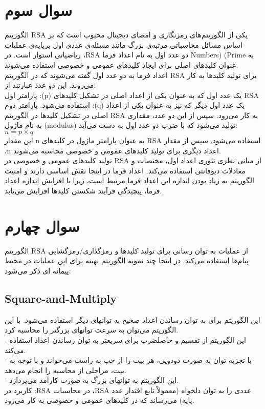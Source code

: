 \section{سوال سوم}
الگوریتم RSA یکی از الگوریتم‌های رمزنگاری و امضای دیجیتال محبوب است که بر اساس مسائل محاسباتی مرتبه‌ی بزرگ مانند مسئله‌ی عددی اول برپایه‌ی عملیات ریاضیاتی استوار است. در ،RSA دو عدد اول به نام اعداد فرما Numbers) (Prime به عنوان کلیدهای اصلی برای ایجاد کلیدهای عمومی و خصوصی استفاده می‌شوند.\\
اعداد فرما به دو عدد اول گفته می‌شوند که در الگوریتم RSA برای تولید کلیدها به کار می‌روند. این دو عدد عبارتند از:\\
پارامتر اول :(p) یک عدد اول که به عنوان یکی از اعداد اصلی در تشکیل کلیدهای RSA استفاده می‌شود.
پارامتر دوم :(q)  یک عدد اول دیگر که نیز به عنوان یکی از اعداد اصلی در تشکیل کلیدها در الگوریتم RSA  به کار می‌رود.
سپس از این دو عدد، مقداری به نام ماژول (modulus) تولید می‌شود که با ضرب دو عدد اول به دست می‌آید:\\
$n = p \times q$\\
این مقدار n به عنوان پارامتر ماژول در کلیدهای RSA استفاده می‌شود. سپس از مقدار ،n اعداد دیگری برای تولید کلیدهای عمومی و خصوصی محاسبه می‌شوند.\\
تولید کلیدهای عمومی و خصوصی در RSA از مبانی نظری تئوری اعداد اول، مختصات و معادلات دیوفانتی استفاده می‌کند. اعداد فرما در اینجا نقش اساسی دارند و امنیت الگوریتم به زیاد بودن اندازه این اعداد فرما مرتبط است، زیرا با افزایش اندازه اعداد فرما، پیچیدگی فرآیند شکستن کلیدها افزایش می‌یابد.


\section{سوال چهارم}
الگوریتم RSA از عملیات به توان رسانی برای تولید کلیدها و رمزگذاری/رمزگشایی پیام‌ها استفاده می‌کند. در اینجا چند نمونه الگوریتم بهینه برای این عملیات در محیط پیمانه ای ذکر می‌شود:
\subsection{Square-and-Multiply}
  این الگوریتم برای به توان رساندن اعداد صحیح به توانهای دیگر استفاده می‌شود. با این الگوریتم می‌توان به سرعت توانهای بزرگتر را محاسبه کرد.\\
     - این الگوریتم از تقسیم و حاصلضرب برای سریعتر به توان رساندن اعداد استفاده می‌کند.\\
     - با تجزیه توان به صورت دودویی، هر بیت را از چپ به راست می‌خواند و با توجه به بیت، مراحلی از محاسبه را انجام می‌دهد.\\
     - این الگوریتم به توانهای بزرگ به صورت کارآمد می‌پردازد.\\
کاربرد در :RSA در محاسبات ،RSA عددی را به توان دلخواه (معمولاً تابع اقتدار عدد پایه) می‌رساند که در کلیدهای عمومی و خصوصی به کار می‌رود.
